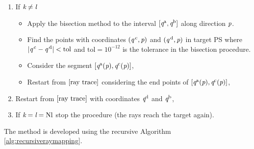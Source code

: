 \begin{enumerate}
\begin{itemize}
\end{itemize}
\item If $\textit{k}\neq\textit{l}$ 
\begin{itemize}
\item Apply the bisection method to the interval $[\textit{q}^{\textrm{a}}, \textit{q}^{\textrm{b}}]$ along direction $\textit{p}$.
\item Find the points with coordinates $(\textit{q}^{\,\textrm{c}}, \textit{p})$ and $(\textit{q}^{\,\textrm{d}}, \textit{p})$ in target PS  where $|\textit{q}^{\,\textrm{c}}-\textit{q}^{\,\textrm{d}}|<\textrm{tol}$ and $\textrm{tol}=10^{-12}$ is the tolerance in the bisection procedure. 
\item Consider the segment $[\textit{q}^{\textrm{a}}(\textit{p}),\textit{q}^{\textrm{c}}(\textit{p})]$,
\item Restart from $\ref{ray trace}$ considering the end points of $[\textit{q}^{\textrm{a}}(\textit{p}),\textit{q}^{\textrm{c}}(\textit{p})]$,
\end{itemize}
\item Restart from $\ref{ray trace}$ with coordinates $\textit{q}^{\textrm{d}}$ and $\textit{q}^{\textrm{b}}$,
\item If $\textit{k}=\textit{l}= \textrm{Nl}$ stop the procedure (the rays reach the target again).
\end{enumerate}
The method is developed using the recursive Algorithm \ref{alg:recursiveraymapping}.

